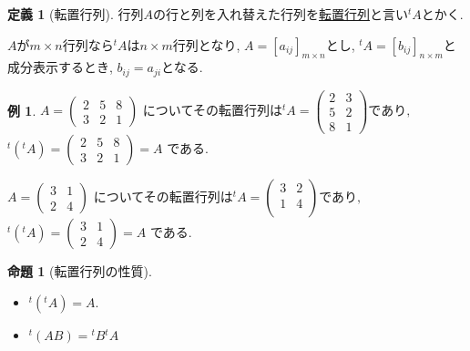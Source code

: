 \documentclass[dvipdfmx,a4paper,11pt]{article} %
\theoremstyle{definition}
\newtheorem{prop}[thm]{命題}
\newtheorem{dfn}[thm]{定義}
\newtheorem{exa}[thm]{例}
\begin{document}
\begin{dfn}[転置行列]
 行列$A$の行と列を入れ替えた行列を\underline{転置行列}と言い${}^{t}A$とかく.
 
$A$が$m\times n$行列なら${}^{t}A $は$n\times m$行列となり,  $A=[a_{ij}]_{m \times n}$とし, ${}^{t}A=[b_{ij}]_{n \times m}$と成分表示するとき, $b_{ij} =a_{ji}$となる. 
\end{dfn}
\begin{exa}
 $
 A = 
 \begin{pmatrix}
 2 &5&8 \\
 3&2&1
 \end{pmatrix}
 \text{ についてその転置行列は}
{}^{t}A = 
 \begin{pmatrix}
 2 &3 \\
 5&2\\
 8&1
 \end{pmatrix}
  \text{であり, }
 $
 $
{}^{t}({}^{t}A) = 
 \begin{pmatrix}
 2 &5&8 \\
 3&2&1
 \end{pmatrix}
 =A
 $
 である.
 
  $
 A = 
 \begin{pmatrix}
 3 &1 \\
 2&4
 \end{pmatrix}
 \text{ についてその転置行列は}
{}^{t}A = 
 \begin{pmatrix}
 3 &2 \\
 1&4\\
 \end{pmatrix}
  \text{であり, }
 $
  $
{}^{t}({}^{t}A) = 
 \begin{pmatrix}
 3 &1 \\
 2&4
 \end{pmatrix}
 =A
 $
 である.
\end{exa}

    \begin{prop}[転置行列の性質]
    \text{}
\begin{itemize}
  \setlength{\parskip}{0cm} 
  \setlength{\itemsep}{0cm}
\item ${}^{t}({}^{t}A) =A$.
\item\cite[問題 2.1.10]{O} ${}^{t}(AB) = {}^{t}B {}^{t}A$
\end{itemize}
  \end{prop}
 
\end{document}
